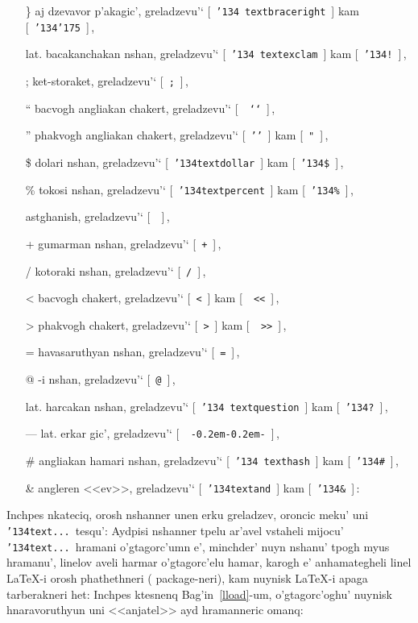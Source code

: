 \documentclass[12pt,a4paper]{article}
\def\mybs{\char'134}
\def\myrbrace{\char'175}
\begin{document}
\begin{itemize}
\item[\artm \}]\quad aj dzevavor p'akagic', greladzevu'` [~{\tt \mybs
    textbraceright}~] kam [~{\tt \mybs\myrbrace}~]$\,$,
\item[\artm \!]\quad lat. bacakanchakan nshan, greladzevu'` [~{\tt \mybs
    textexclam}~] kam [~{\tt \mybs!}~]$\,$,
\item[\artm ;]\quad ket-storaket, greladzevu'` [~{\tt ;}~]$\,$,
\item[\artm ``]\quad bacvogh angliakan chakert, greladzevu'` [~{\tt
    `{}`}~]$\,$,
\item[\artm '']\quad phakvogh angliakan chakert, greladzevu'` [~{\tt '{}'}~]
  kam [~{\tt "}~]$\,$,
\item[\artm \$]\quad dolari nshan, greladzevu'` [~{\tt \mybs textdollar}~] kam
  [~{\tt \mybs\$}~]$\,$,
\item[\artm \%]\quad tokosi nshan, greladzevu'` [~{\tt \mybs textpercent}~]
  kam [~{\tt \mybs\%}~]$\,$,
\item[\artm *]\quad astghanish, greladzevu'` [~{\tt *}~]$\,$,
\item[\artm +]\quad gumarman nshan, greladzevu'` [~{\tt +}~]$\,$,
\item[\artm /]\quad kotoraki nshan, greladzevu'` [~{\tt /}~]$\,$,
\item[\artm <]\quad bacvogh chakert, greladzevu'` [~{\tt <}~] kam [~{\tt
    <<}~]$\,$,
\item[\artm >]\quad phakvogh chakert, greladzevu'` [~{\tt >}~] kam [~{\tt
    >>}~]$\,$,
\item[\artm =]\quad havasaruthyan nshan, greladzevu'` [~{\tt =}~]$\,$,
\item[\artm @]-i nshan, greladzevu'` [~{\tt @}~]$\,$,
\item[\artm \?]\quad lat. harcakan nshan, greladzevu'` [~{\tt \mybs
    textquestion}~] kam [~{\tt \mybs?}~]$\,$,
\item[\artm ---]\quad lat. erkar gic', greladzevu'` [~{\tt
    -{\kern0.2em}-{\kern0.2em}-}~]$\,$,
\item[\artm \#]\quad angliakan hamari nshan, greladzevu'` [~{\tt \mybs
    texthash}~] kam [~{\tt \mybs\#}~]$\,$,
\item[\artm \&]\quad angleren <<ev>>, greladzevu'` [~{\tt \mybs textand}~] kam
  [~{\tt \mybs\&}~]$\,$:
\end{itemize}

Inchpes nkateciq, orosh nshanner unen erku greladzev, oroncic meku' uni {\tt
  \mybs text...}\ tesqu': Aydpisi nshanner tpelu ar'avel vstaheli mijocu' {\tt
  \mybs text...}\ hramani o'gtagorc'umn e', minchder' nuyn nshanu' tpogh myus
hra\-ma\-nu', linelov aveli harmar o'gtagorc'elu hamar, karogh e'
an\-ha\-ma\-te\-ghe\-li linel {\aroff\LaTeX}-i orosh phathethneri ({\rm
  package}-neri), kam nuynisk {\aroff\LaTeX}-i apaga tarberakneri het: Inchpes
ktesnenq Bag'in~\ref{lload}-um, o'g\-ta\-gor\-c'o\-ghu' nuynisk hnaravoruthyun
uni <<anjatel>> ayd hramanneric omanq:
\end{document}
